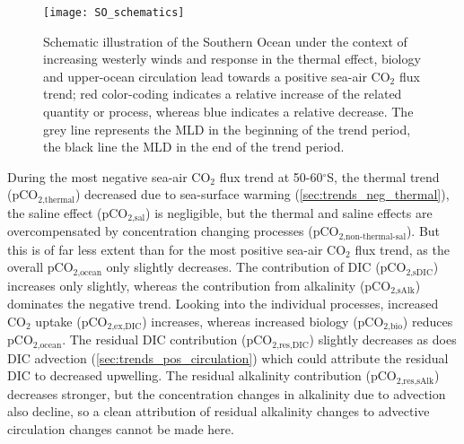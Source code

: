 \begin{figure}[hbt]
	\centering
	\texttt{[image: SO\_schematics]}
	\caption{Schematic illustration of the Southern Ocean under the context of increasing westerly winds and response in the thermal effect, biology and upper-ocean circulation lead towards a positive sea-air CO$_2$ flux trend; red color-coding indicates a relative increase of the related quantity or process, whereas blue indicates a relative decrease. The grey line represents the \acf{MLD} in the beginning of the trend period, the black line the \acs{MLD} in the end of the trend period.}
	\label{fig:schematics_pos}
\end{figure}

\clearpage

During the most negative sea-air CO$_2$ flux trend at 50-60$^\circ$S, the thermal trend (pCO$_{\text{2,thermal}}$) decreased due to sea-surface warming (\autoref{sec:trends_neg_thermal}), the saline effect (pCO$_{\text{2,sal}}$) is negligible, but the thermal and saline effects are overcompensated by concentration changing processes (pCO$_{\text{2,non-thermal-sal}}$). But this is of far less extent than for the most positive sea-air CO$_2$ flux trend, as the overall pCO$_{\text{2,ocean}}$ only slightly decreases.
The contribution of \acs{DIC} (pCO$_{\text{2,sDIC}}$) increases only slightly, whereas the contribution from alkalinity (pCO$_{\text{2,sAlk}}$) dominates the negative trend. Looking into the individual processes, increased CO$_2$ uptake (pCO$_{\text{2,ex,DIC}}$) increases, whereas increased biology (pCO$_{\text{2,bio}}$) reduces pCO$_{\text{2,ocean}}$. The residual \acs{DIC} contribution (pCO$_{\text{2,res,DIC}}$) slightly decreases as does \acs{DIC} advection (\autoref{sec:trends_pos_circulation}) which could attribute the residual \acs{DIC} to decreased upwelling. The residual alkalinity contribution (pCO$_{\text{2,res,sAlk}}$) decreases stronger, but the concentration changes in alkalinity due to advection also decline, so a clean attribution of residual alkalinity changes to advective circulation changes cannot be made here.  

